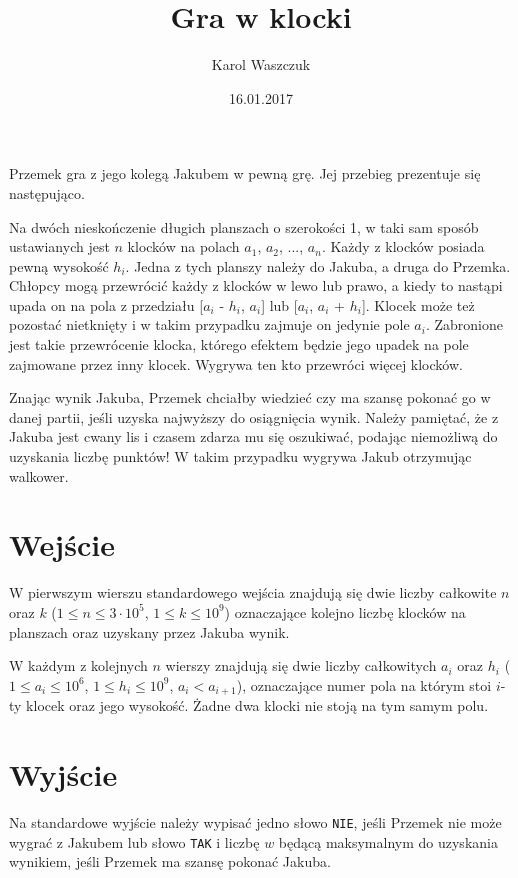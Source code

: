 \documentclass[zad,zawodnik,utf8]{sinol}
\title{Gra w klocki}
\author{Karol Waszczuk} %
\date{16.01.2017}
\begin{document}
\begin{tasktext}%

Przemek gra z jego kolegą Jakubem w pewną grę. Jej przebieg prezentuje się następująco. 

Na dwóch nieskończenie długich planszach o szerokości 1, w taki sam sposób ustawianych jest $n$ klocków na polach $a_1$, $a_2$, ..., $a_n$. Każdy z klocków posiada pewną wysokość $h_i$. Jedna z tych planszy należy do Jakuba, a druga do Przemka. Chłopcy mogą przewrócić każdy z klocków w lewo lub prawo, a kiedy to nastąpi upada on na pola z przedziału [$a_i$ - $h_i$, $a_i$] lub [$a_i$, $a_i$ + $h_i$]. Klocek może też pozostać nietknięty i w takim przypadku zajmuje on jedynie pole $a_i$. Zabronione jest takie przewrócenie klocka, którego efektem będzie jego upadek na pole zajmowane przez inny klocek. Wygrywa ten kto przewróci więcej klocków.

Znając wynik Jakuba, Przemek chciałby wiedzieć czy ma szansę pokonać go w danej partii, jeśli uzyska najwyższy do osiągnięcia wynik. Należy pamiętać, że z Jakuba jest cwany lis i czasem zdarza mu się oszukiwać, podając niemożliwą do uzyskania liczbę punktów! W takim przypadku wygrywa Jakub otrzymując walkower.

  \section{Wejście}

W pierwszym wierszu standardowego wejścia znajdują się dwie liczby całkowite $n$ oraz $k$ ($1 \leq n \leq 3 \cdot 10^5$, $1 \leq k \leq 10^9$) oznaczające kolejno liczbę klocków na planszach oraz uzyskany przez Jakuba wynik.

W każdym z kolejnych $n$ wierszy znajdują się dwie liczby całkowitych $a_i$ oraz $h_i$ ($1 \leq a_i \leq 10^6$, $1 \leq h_i \leq 10^9$, $ a_i < a_{i+1}$), oznaczające numer pola na którym stoi $i$-ty klocek oraz jego wysokość. Żadne dwa klocki nie stoją na tym samym polu.

  \section{Wyjście}
Na standardowe wyjście należy wypisać jedno słowo \texttt{NIE}, jeśli Przemek nie może wygrać z Jakubem lub słowo \texttt{TAK} i liczbę $w$ będącą maksymalnym do uzyskania wynikiem, jeśli Przemek ma szansę pokonać Jakuba.

\makecompactexample 



\end{tasktext}
\end{document}
